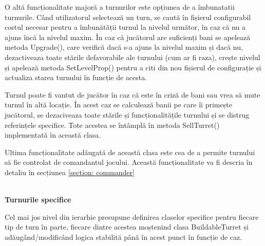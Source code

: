 \documentclass[12pt, a4paper]{article}
\begin{document}
	O altă funcționalitate majoră a turnurilor este opțiunea de a îmbunatatii turnurile. Când utilizatorul selectează un turn, se caută în fișierul configurabil costul necesar pentru a îmbunătății turnul la nivelul următor, în caz că nu a ajuns încă la nivelul maxim. În caz că jucătorul are suficienți bani se apelează metoda Upgrade(), care verifică dacă s-a ajuns la nivelul maxim și dacă nu, dezactiveaza toate stările defavorabile ale turnului (cum ar fi raza), crește nivelul și apelează metoda SetLevelProp() pentru a citi din nou fișierul de configurație și actualiza starea turnului în funcție de acesta.
	\newline
	
	Turnul poate fi vantut de jucător în caz că este în criză de bani sau vrea să mute turnul în altă locație. În acest caz se calculează banii pe care îi primește jucătorul, se dezaciveaza toate stările și funcționalitățile turnului și se distrug referințele specifice. Tote acestea se întâmplă în metoda SellTurret() implementată în această clasa.
	\newline
	
	Ultima funcționalitate adăugată de această clasa este cea de a permite turnului să fie controlat de comandantul jocului. Această funcționalitate va fi descria în detaliu în secțiunea \ref{section: commander} 
	
	\ \\
	\textbf{Turnurile specifice}
	
	Cel mai jos nivel din ierarhie presupune definirea claselor specifice pentru fiecare tip de turn în parte, fiecare dintre acestea moștenind clasa BuildableTurret și adăugând/modificând logica stabilită până în acest punct în funcție de caz.
	
\end{document}
